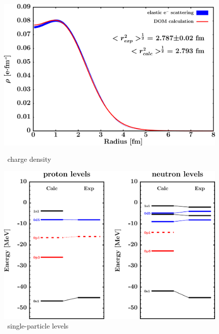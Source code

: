 \begin{figure}[hbtp]
    \centering
    \begin{minipage}{0.42\textwidth}
        \centering
        \includegraphics[width=\textwidth]{figures/o18_chargeDensity.png}
        \caption*{\oEight\ charge density}
        \label{DOMFitData_o18_chargeDensity}
    \end{minipage}\hspace{6pt}
    \begin{minipage}{0.42\textwidth}
        \centering
        \includegraphics[width=\textwidth]{figures/o18_SPLevels.png}
        \caption*{\oEight\ single-particle levels}
        \label{DOMFitData_o18_SPLevels}
    \end{minipage}
\end{figure}
